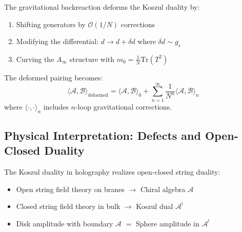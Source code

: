 \begin{theorem}\label{thm:backreaction}
The gravitational backreaction deforms the Koszul duality by:
\begin{enumerate}
\item Shifting generators by $\mathcal{O}(1/N)$ corrections
\item Modifying the differential: $d \to d + \delta d$ where $\delta d \sim g_s$
\item Curving the $A_\infty$ structure with $m_0 = \frac{1}{N}\text{Tr}(T^2)$
\end{enumerate}

The deformed pairing becomes:
$$\langle \mathcal{A}, \mathcal{B} \rangle_{\text{deformed}} = \langle \mathcal{A}, \mathcal{B} \rangle_0 + \sum_{n=1}^\infty \frac{1}{N^n} \langle \mathcal{A}, \mathcal{B} \rangle_n$$
where $\langle \cdot, \cdot \rangle_n$ includes $n$-loop gravitational corrections.
\end{theorem}

\subsection{Physical Interpretation: Defects and Open-Closed Duality}

\begin{interpretation}
The Koszul duality in holography realizes open-closed string duality:

\begin{center}
\end{center}

\begin{itemize}
\item Open string field theory on branes $\to$ Chiral algebra $\mathcal{A}$
\item Closed string field theory in bulk $\to$ Koszul dual $\mathcal{A}^!$
\item Disk amplitude with boundary $\mathcal{A}$ $=$ Sphere amplitude in $\mathcal{A}^!$
\end{itemize}
\end{interpretation}

